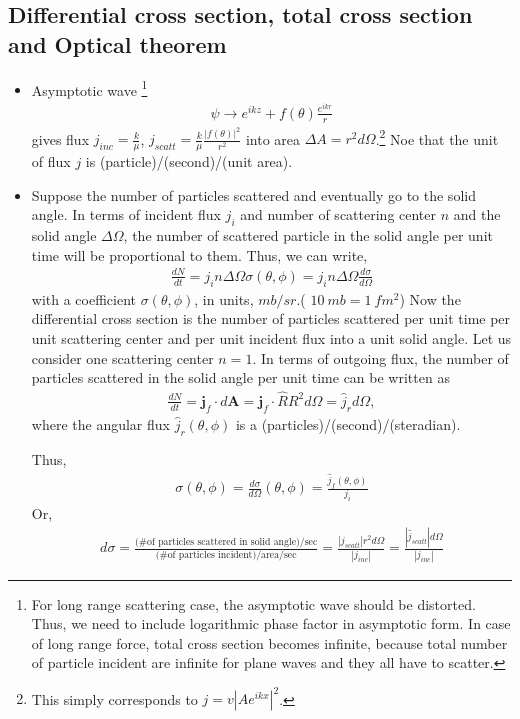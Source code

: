 \documentclass[10pt]{article}
\def\bm{\boldsymbol}
\newcommand{\bea}{\begin{eqnarray}}
\newcommand{\eea}{\end{eqnarray}}
\begin{document}
\subsection{Differential cross section, total cross section and
 Optical theorem}
\begin{itemize}
\item Asymptotic wave \footnote{
For long range scattering case, the asymptotic wave should be
distorted. Thus, we need to include logarithmic phase factor
in asymptotic form. In case of long range force,
total cross section becomes infinite, because
total number of particle incident are infinite for
plane waves and they all have to scatter.
}
\bea
\psi\to e^{ikz}+f(\theta)\frac{e^{ikr}}{r}
\eea
gives flux $j_{inc}=\frac{k}{\mu}$, 
$j_{scatt}=\frac{k}{\mu}\frac{|f(\theta)|^2}{r^2}$
into area $\Delta A=r^2 d\Omega$.\footnote{
This simply corresponds to $j=v|A e^{ikx}|^2$.
}
Noe that the unit of flux $j$ is (particle)/(second)/(unit area).  

\item Suppose the number of particles scattered and eventually go to the solid angle. 
In terms of incident flux $j_i$ and number of scattering center $n$ and the solid angle
$\Delta\Omega$,
the number of scattered particle in the solid angle per unit time 
will be proportional to them. Thus, we can write,
\bea
\frac{dN}{dt}=j_i n \Delta\Omega\sigma(\theta,\phi) =j_i n \Delta\Omega \frac{d\sigma}{d\Omega} 
\eea
with a coefficient $\sigma(\theta,\phi)$, in units, $mb/sr$.( $10\ mb=1\ fm^2$)  
Now the differential cross section  is the number of particles scattered 
per unit time per unit scattering center and per unit incident flux
into a unit solid angle. Let us consider one scattering center $n=1$.
In terms of outgoing flux, 
the number of particles scattered in the solid angle per unit time can be written as
\bea 
\frac{d N}{dt}= {\bm j}_f\cdot d {\bm A} = {\bm j}_f\cdot\hat{R} R^2 d\Omega 
              = \hat{j}_r d\Omega,
\eea 
where the angular flux $\hat{j}_r(\theta,\phi)$ is a (particles)/(second)/(steradian). 

Thus, 
\bea 
\sigma(\theta,\phi)=\frac{d\sigma}{d\Omega}(\theta,\phi)=  \frac{\hat{j}_f(\theta,\phi)}{j_i}
\eea 
Or, 
\bea
d\sigma
=\frac{\mbox{(\# of particles scattered in solid angle)/sec}}
    {\mbox{(\# of particles incident)/area/sec}}
=\frac{|j_{scatt}| r^2 d \Omega}{|j_{inc}|}= \frac{|\hat{j}_{scatt}|d \Omega}{|j_{inc}|}   
\eea


\end{itemize}
\end{document}
